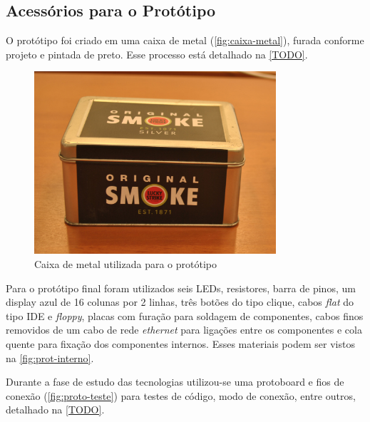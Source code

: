 \documentclass[
		12pt,				%
		openright,			%
		oneside,			%
		a4paper,			%
		chapter=TITLE,		%
		english,			%
		brazil				%
	]{abntex2}
\begin{document}
\subsection{Acessórios para o Protótipo}\label{sec:acess-prototipo}

O protótipo foi criado em uma caixa de metal (\autoref{fig:caixa-metal}), furada conforme projeto e pintada de preto. Esse processo está detalhado na \autoref{TODO}. 

\begin{figure}[htb]
	\caption{\label{fig:caixa-metal}Caixa de metal utilizada para o protótipo}
	\begin{center}
		\includegraphics[width=0.8\textwidth]{img/caixa-metal.jpg}
	\end{center}
\end{figure}

Para o protótipo final foram utilizados seis LEDs, resistores, barra de pinos, um display azul de 16 colunas por 2 linhas, três botões do tipo clique, cabos \textit{flat} do tipo IDE e \textit{floppy}, placas com furação para soldagem de componentes, cabos finos removidos de um cabo de rede \textit{ethernet} para ligações entre os componentes e cola quente para fixação dos componentes internos. Esses materiais podem ser vistos na \autoref{fig:prot-interno}.

Durante a fase de estudo das tecnologias utilizou-se uma protoboard e fios de conexão (\autoref{fig:proto-teste}) para testes de código, modo de conexão, entre outros, detalhado na \autoref{TODO}.
\end{document}
